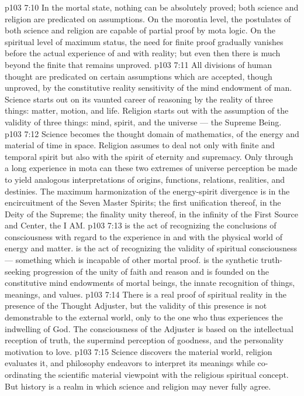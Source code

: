 \vs p103 7:10 \pc In the mortal state, nothing can be absolutely proved; both science and religion are predicated on assumptions. On the morontia level, the postulates of both science and religion are capable of partial proof by mota logic. On the spiritual level of maximum status, the need for finite proof gradually vanishes before the actual experience of and with reality; but even then there is much beyond the finite that remains unproved.
\vs p103 7:11 All divisions of human thought are predicated on certain assumptions which are accepted, though unproved, by the constitutive reality sensitivity of the mind endowment of man. Science starts out on its vaunted career of reasoning by  the reality of three things: matter, motion, and life. Religion starts out with the assumption of the validity of three things: mind, spirit, and the universe --- the Supreme Being.
\vs p103 7:12 Science becomes the thought domain of mathematics, of the energy and material of time in space. Religion assumes to deal not only with finite and temporal spirit but also with the spirit of eternity and supremacy. Only through a long experience in mota can these two extremes of universe perception be made to yield analogous interpretations of origins, functions, relations, realities, and destinies. The maximum harmonization of the energy\hyp{}spirit divergence is in the encircuitment of the Seven Master Spirits; the first unification thereof, in the Deity of the Supreme; the finality unity thereof, in the infinity of the First Source and Center, the I AM.
\vs p103 7:13 \pc {} is the act of recognizing the conclusions of consciousness with regard to the experience in and with the physical world of energy and matter.  is the act of recognizing the validity of spiritual consciousness --- something which is incapable of other mortal proof.  is the synthetic truth\hyp{}seeking progression of the unity of faith and reason and is founded on the constitutive mind endowments of mortal beings, the innate recognition of things, meanings, and values.
\vs p103 7:14 \pc There is a real proof of spiritual reality in the presence of the Thought Adjuster, but the validity of this presence is not demonstrable to the external world, only to the one who thus experiences the indwelling of God. The consciousness of the Adjuster is based on the intellectual reception of truth, the supermind perception of goodness, and the personality motivation to love.
\vs p103 7:15 Science discovers the material world, religion evaluates it, and philosophy endeavors to interpret its meanings while co\hyp{}ordinating the scientific material viewpoint with the religious spiritual concept. But history is a realm in which science and religion may never fully agree.
